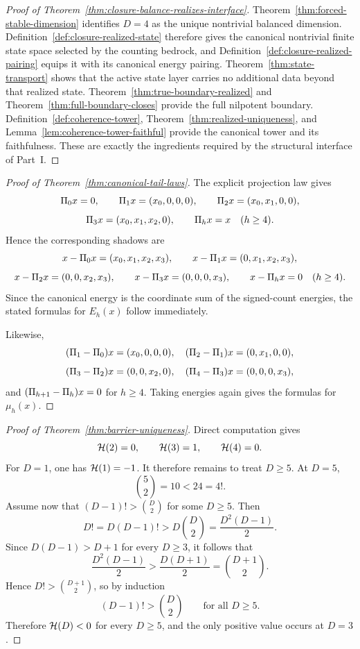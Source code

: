 \label{sec:appendix-topology}

\begin{proof}[Proof of Theorem~\ref{thm:closure-balance-realizes-interface}]
\label{proof:thm:closure-balance-realizes-interface}
Theorem~\ref{thm:forced-stable-dimension} identifies $D=4$ as the unique
nontrivial balanced dimension. Definition~\ref{def:closure-realized-state}
therefore gives the canonical nontrivial finite state space selected by the
counting bedrock, and Definition~\ref{def:closure-realized-pairing} equips it
with its canonical energy pairing. Theorem~\ref{thm:state-transport} shows that
the active state layer carries no additional data beyond that realized state.
Theorem~\ref{thm:true-boundary-realized} and
Theorem~\ref{thm:full-boundary-closes} provide the full nilpotent boundary.
Definition~\ref{def:coherence-tower}, Theorem~\ref{thm:realized-uniqueness},
and Lemma~\ref{lem:coherence-tower-faithful} provide the canonical tower and
its faithfulness. These are exactly the ingredients required by the structural
interface of Part~I.
\end{proof}

\begin{proof}[Proof of Theorem~\ref{thm:canonical-tail-laws}]
\label{proof:thm:canonical-tail-laws}
The explicit projection law gives
\[
\Pi_{0}x=0,\qquad
\Pi_{1}x=(x_0,0,0,0),\qquad
\Pi_{2}x=(x_0,x_1,0,0),
\]
\[
\Pi_{3}x=(x_0,x_1,x_2,0),\qquad
\Pi_{h}x=x \quad (h\ge 4).
\]
Hence the corresponding shadows are
\[
x-\Pi_{0}x=(x_0,x_1,x_2,x_3),\qquad
x-\Pi_{1}x=(0,x_1,x_2,x_3),
\]
\[
x-\Pi_{2}x=(0,0,x_2,x_3),\qquad
x-\Pi_{3}x=(0,0,0,x_3),\qquad
x-\Pi_{h}x=0 \quad (h\ge 4).
\]
Since the canonical energy is the coordinate sum of the signed-count energies,
the stated formulas for $E_h(x)$ follow immediately.

Likewise,
\[
(\Pi_{1}-\Pi_{0})x=(x_0,0,0,0),\quad
(\Pi_{2}-\Pi_{1})x=(0,x_1,0,0),
\]
\[
(\Pi_{3}-\Pi_{2})x=(0,0,x_2,0),\quad
(\Pi_{4}-\Pi_{3})x=(0,0,0,x_3),
\]
and $(\Pi_{h+1}-\Pi_{h})x=0$ for $h\ge 4$. Taking energies again gives the
formulas for $\mu_h(x)$.
\end{proof}

\begin{proof}[Proof of Theorem~\ref{thm:barrier-uniqueness}]
\label{proof:thm:barrier-uniqueness}
Direct computation gives
\[
\mathcal{H}(2)=0,\qquad \mathcal{H}(3)=1,\qquad \mathcal{H}(4)=0.
\]
For $D=1$, one has $\mathcal{H}(1)= -1$. It therefore remains to treat $D\ge 5$.
At $D=5$,
\[
\binom{5}{2}=10<24=4!.
\]
Assume now that $(D-1)!>\binom{D}{2}$ for some $D\ge 5$. Then
\[
D! = D(D-1)! > D\binom{D}{2} = \frac{D^2(D-1)}{2}.
\]
Since $D(D-1)>D+1$ for every $D\ge 3$, it follows that
\[
\frac{D^2(D-1)}{2} > \frac{D(D+1)}{2} = \binom{D+1}{2}.
\]
Hence $D!>\binom{D+1}{2}$, so by induction
\[
(D-1)!>\binom{D}{2}
\qquad\text{for all }D\ge 5.
\]
Therefore $\mathcal{H}(D)<0$ for every $D\ge 5$, and the only positive value occurs at
$D=3$.
\end{proof}

